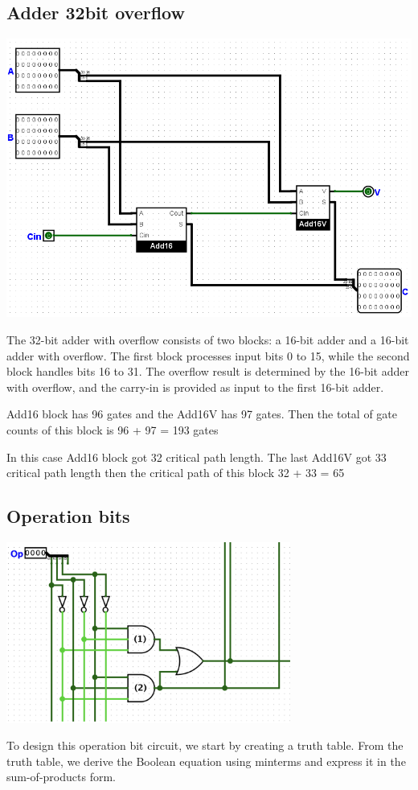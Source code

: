\documentclass{article}
\begin{document}
\subsection{Adder 32bit overflow}
\begin{center}
    \includegraphics[width=1\textwidth]{images/Add32.png}
\end{center}
\hspace*{2em}The 32-bit adder with overflow consists of two blocks: a 16-bit adder and a 16-bit adder with overflow. The first block processes input bits 0 to 15, while the second block handles bits 16 to 31. The overflow result is determined by the 16-bit adder with overflow, and the carry-in is provided as input to the first 16-bit adder.

\hspace{2em}Add16 block has 96 gates and the Add16V has 97 gates. Then the total of gate counts of this block is 96 + 97 = 193 gates

\hspace{2em}In this case Add16 block got 32 critical path length. The last Add16V got 33 critical path length then the critical path of this block 32 + 33 = 65
\subsection{Operation bits}
\begin{center}
    \includegraphics[width=0.7\textwidth]{images/AddSubSelectionsBits.png}
\end{center}
\hspace{2em}To design this operation bit circuit, we start by creating a truth table. From the truth table, we derive the Boolean equation using minterms and express it in the sum-of-products form.
\end{document}
